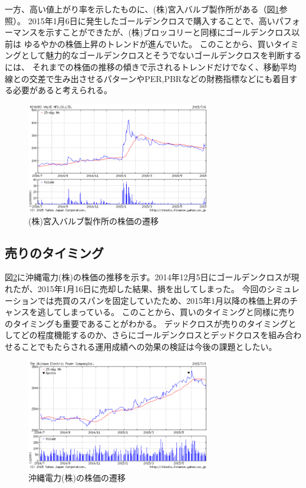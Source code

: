 \documentclass[twocolumn,jsaiac]{jarticle}
\begin{document}
一方、高い値上がり率を示したものに、(株)宮入バルブ製作所がある（図\ref{fig:miyairi}参照）。
2015年1月6日に発生したゴールデンクロスで購入することで、高いパフォーマンスを示すことができたが、(株)ブロッコリーと同様にゴールデンクロス以前は
ゆるやかの株価上昇のトレンドが進んでいた。
このことから、買いタイミングとして魅力的なゴールデンクロスとそうでないゴールデンクロスを判断するには、
それまでの株価の推移の傾きで示されるトレンドだけでなく、移動平均線との交差で生み出させるパターンやPER,PBRなどの財務指標などにも着目する必要があると考えられる。
\begin{figure}[htb]
\begin{center}
\includegraphics[width=8cm,clip]{miyairi.png}
\end{center}
\caption{(株)宮入バルブ製作所の株価の遷移}
\label{fig:miyairi}
\end{figure}

\subsection{売りのタイミング}
図\ref{fig:okinawa}に沖縄電力(株)の株価の推移を示す。2014年12月5日にゴールデンクロスが現れたが、2015年1月16日に売却した結果、損を出してしまった。
今回のシミュレーションでは売買のスパンを固定していたため、2015年1月以降の株価上昇のチャンスを逃してしまっている。
このことから、買いのタイミングと同様に売りのタイミングも重要であることがわかる。
デッドクロスが売りのタイミングとしてどの程度機能するのか、さらにゴールデンクロスとデッドクロスを組み合わせることでもたらされる運用成績への効果の検証は今後の課題としたい。
\begin{figure}[htb]
\begin{center}
\includegraphics[width=8cm,clip]{okinawa.png}
\end{center}
\caption{沖縄電力(株)の株価の遷移}
\label{fig:okinawa}
\end{figure}
\end{document}
